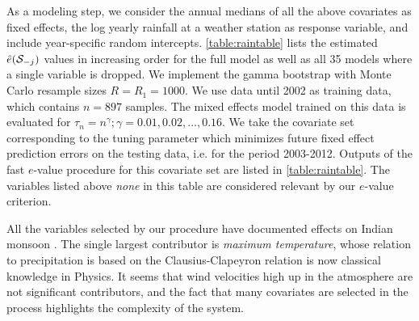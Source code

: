 As a modeling step, we consider the  annual medians of all the above covariates as fixed effects, the log yearly rainfall at a weather station as response variable, and include year-specific random intercepts. \ref{table:raintable} lists the estimated $\hat{e} ({\cal{S}}_{ -j})$ values in increasing order for the full model as well as all 35  models where a single variable is dropped. We implement the gamma bootstrap with Monte Carlo resample sizes $R = R_1 = 1000$. We use data until 2002 as training data, which contains $n=897$ samples. The mixed effects model trained on this data is evaluated for $\tau_n = n^\gamma; \gamma = 0.01, 0.02, \ldots, 0.16$. We take the covariate set corresponding to the tuning parameter which minimizes future fixed effect prediction errors on the testing data, i.e. for the period 2003-2012. Outputs of the fast $e$-value procedure for this covariate set are listed in \ref{table:raintable}. The variables listed above {\textit{none}} in this table are considered relevant by our $e$-value criterion.

All the variables selected by our procedure have documented effects on Indian monsoon \citep{KrishChapter, MoonWangHa12}. The single largest contributor is {\textit{maximum temperature}}, whose relation to  precipitation is based on the Clausius-Clapeyron relation is now classical knowledge in Physics. It seems 
that wind velocities high up in the atmosphere are not significant contributors, and the fact that many covariates are selected in the process highlights the complexity of the system.


